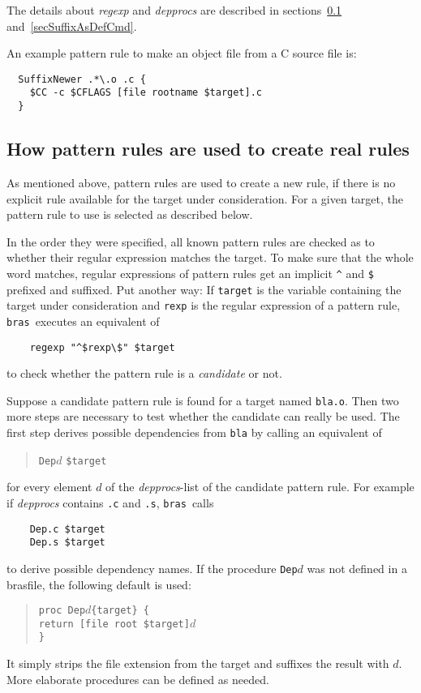 \documentclass[12pt]{article}
\newcommand{\bras}{\texttt{bras}}
\begin{document}
The details about \textit{regexp} and \textit{depprocs} are described
in sections~\ref{secSuffixToReal} and~\ref{secSuffixAsDefCmd}.

An example pattern rule to make an object file from a C source file is:
\begin{verbatim}
  SuffixNewer .*\.o .c {
    $CC -c $CFLAGS [file rootname $target].c
  }
\end{verbatim}

\subsection{How pattern rules are used to create real rules}
\label{secSuffixToReal}

As mentioned above, pattern rules are used to create a new rule, if
there is no explicit rule available for the target under
consideration. 
For a given target, the pattern rule to use is selected as described
below.

In the order they were specified, all known pattern rules are checked
as to whether their regular expression matches the target. To make
sure that the whole word matches, regular expressions of pattern rules
get an implicit \verb+^+ and \texttt{\$} prefixed and suffixed. Put
another way: If \texttt{target} is the variable containing the target
under consideration and \texttt{rexp} is the regular expression of a
pattern rule, \bras\ executes an equivalent of
\begin{verbatim}
    regexp "^$rexp\$" $target
\end{verbatim}
to check whether the pattern rule is a \textit{candidate} or not.

Suppose a candidate pattern rule is found for a target named
\texttt{bla.o}. Then two more steps are necessary
to test whether the candidate can really be used.
The first step derives possible dependencies
from \texttt{bla} by calling
an equivalent of
\begin{quote}
    \texttt{Dep}$d$ \texttt{\$target}
\end{quote}
for every element $d$ of the \textit{depprocs}-list of the candidate
pattern rule. For example if \textit{depprocs} contains \texttt{.c}
and \texttt{.s}, \bras\ calls
\begin{verbatim}
    Dep.c $target
    Dep.s $target
\end{verbatim}
to derive possible dependency names. If the procedure \texttt{Dep$d$}
was not defined in a brasfile, the following
default is used:
\begin{quote}
    \verb|proc Dep|$d$\verb|{target} {|\\
    \texttt{\hspace*{2em}return [file root \$target]$d$}\\
    \verb|}|
\end{quote}
It simply strips the file extension from the target and suffixes the
result with $d$. More elaborate
procedures can be defined as needed.
\end{document}
